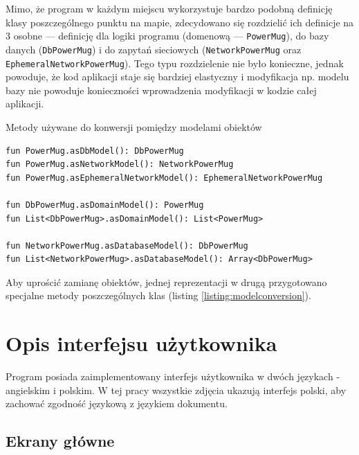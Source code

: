 \documentclass[polish,polish,a4paper,12pt]{article}
\let\sectioncmd\section
\renewcommand{\section}{\clearpage\sectioncmd}
\begin{document}
	Mimo, że program w każdym miejscu wykorzystuje bardzo podobną definicję klasy poszczególnego punktu na mapie, zdecydowano się rozdzielić ich definicje na 3 osobne — definicję dla logiki programu (domenową — \texttt{PowerMug}), do bazy danych (\texttt{DbPowerMug}) i do zapytań sieciowych (\texttt{NetworkPowerMug} oraz \texttt{EphemeralNetworkPowerMug}). Tego typu rozdzielenie nie było konieczne, jednak powoduje, że kod aplikacji staje się bardziej elastyczny i modyfikacja np. modelu bazy nie powoduje konieczności wprowadzenia modyfikacji w kodzie całej aplikacji.

	\begin{listing}[H]
		\caption{Metody używane do konwersji pomiędzy modelami obiektów}
		\begin{verbatim}
fun PowerMug.asDbModel(): DbPowerMug
fun PowerMug.asNetworkModel(): NetworkPowerMug
fun PowerMug.asEphemeralNetworkModel(): EphemeralNetworkPowerMug

fun DbPowerMug.asDomainModel(): PowerMug
fun List<DbPowerMug>.asDomainModel(): List<PowerMug>

fun NetworkPowerMug.asDatabaseModel(): DbPowerMug
fun List<NetworkPowerMug>.asDatabaseModel(): Array<DbPowerMug>
		\end{verbatim}
		\label{listing:modelconversion}
	\end{listing}

	Aby uprościć zamianę obiektów, jednej reprezentacji w drugą przygotowano specjalne metody poszczególnych klas (listing \ref{listing:modelconversion}).

\section{Opis interfejsu użytkownika}\label{ui}

Program posiada zaimplementowany interfejs użytkownika w dwóch językach - angielskim i polskim. W tej pracy wszystkie zdjęcia ukazują interfejs polski, aby zachować zgodność językową z językiem dokumentu.

	\subsection{Ekrany główne}
\end{document}
